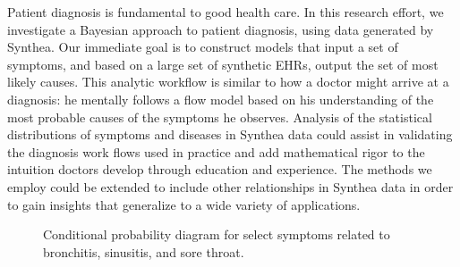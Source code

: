 \documentclass[11pt]{article}
\begin{document}
Patient diagnosis is fundamental to good health care.  In this research effort, we investigate a Bayesian approach to patient diagnosis, using data generated by Synthea. Our immediate goal is to construct models that input a set of symptoms, and based on a large set of synthetic EHRs, output the set of most likely causes.  This analytic workflow is similar to how a doctor might arrive at a diagnosis: he mentally follows a flow model based on his understanding of the most probable causes of the symptoms he observes.  Analysis of the statistical distributions of symptoms and diseases in Synthea data could assist in validating the diagnosis work flows used in practice and add mathematical rigor to the intuition doctors develop through education and experience.  The methods we employ could be extended to include other relationships in Synthea data in order to gain insights that generalize to a wide variety of applications.


\begin{figure}[!bth] \centering
  \caption{Conditional probability diagram for select symptoms related to bronchitis, sinusitis, and sore throat. \label{fig: condprob}}
  \end{figure}
  
\end{document}
